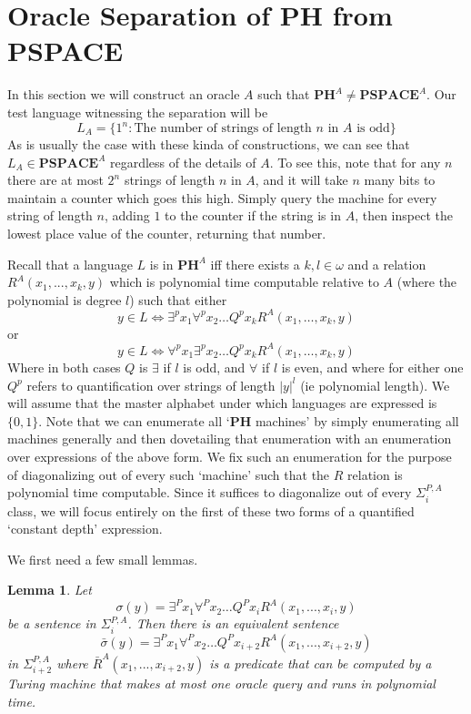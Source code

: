 \documentclass{article}
\theoremstyle{definition}
\theoremstyle{plain}
\theoremstyle{theorem}
\newtheorem{lemma}{Lemma}[section]
\begin{document}
\section{Oracle Separation of PH from PSPACE}
In this section we will construct an oracle $A$ such that $\bm{PH}^A \neq \bm{PSPACE}^A$. Our test language witnessing the separation will be 
\[ L_A =\{1^n: \textrm{The number of strings of length $n$ in $A$ is odd}\} \]
As is usually the case with these kinda of constructions, we can see that $L_A \in \bm{PSPACE}^A$ regardless of the details of $A$. To see this, note that for any $n$ there are at most $2^n$ strings of length $n$ in $A$, and it will take $n$ many bits to maintain a counter which goes this high. Simply query the machine for every string of length $n$, adding $1$ to the counter if the string is in $A$, then inspect the lowest place value of the counter, returning that number. \par 
Recall that a language $L$ is in $\bm{PH}^A$ iff there exists a $k,l \in \omega$ and a relation $R^A(x_1,...,x_k,y)$ which is polynomial time computable relative to $A$ (where the polynomial is degree $l$) such that either 
  \[ y \in L \iff \exists^px_1 \forall^p x_2 \ldots Q^p x_k R^A(x_1,\ldots,x_k,y) \]
 or
  \[ y \in L \iff \forall^px_1 \exists^p x_2 \ldots Q^p x_k R^A(x_1,\ldots,x_k,y) \]
Where in both cases $Q$ is $\exists$ if $l$ is odd, and $\forall$ if $l$ is even, and where for either one $Q^p$ refers to quantification over strings of length $|y|^l$ (ie polynomial length). We will assume that the master alphabet under which languages are expressed is $\{0,1\}$. Note that we can enumerate all `$\bm{PH}$ machines' by simply enumerating all machines generally and then dovetailing that enumeration with an enumeration over expressions of the above form. We fix such an enumeration for the purpose of diagonalizing out of every such `machine' such that the $R$ relation is polynomial time computable. Since it suffices to diagonalize out of every $\Sigma_i^{P,A}$ class, we will focus entirely on the first of these two forms of a quantified `constant depth' expression. \par 
We first need a few small lemmas. 
\begin{lemma}
	Let \[\sigma(y) = \exists^Px_1\forall^P x_2 \ldots Q^P x_i R^A(x_1,...,x_i,y) \]
	be a sentence in $\Sigma^{P,A}_i$. Then there is an equivalent sentence 
	\[ \bar{\sigma}(y) = \exists^Px_1\forall^P x_2 \ldots Q^P x_{i+2}R^A(x_1,...,x_{i+2},y) \]
	in $\Sigma^{P,A}_{i+2}$ where $\bar{R}^A(x_1,...,x_{i+2},y)$ is a predicate that can be computed by a Turing machine that makes at most one oracle query and runs in polynomial time. 
\end{lemma}
\end{document}
